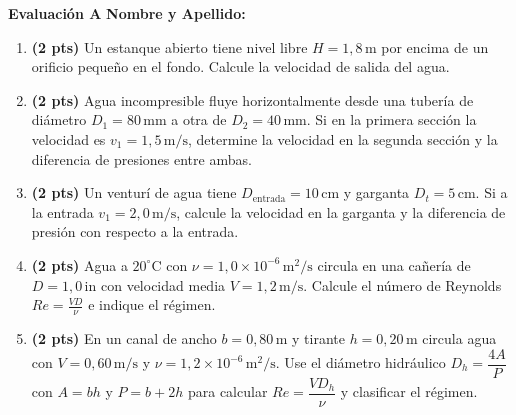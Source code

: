 \documentclass[a4paper,11pt]{article}
\begin{document}
\pagestyle{empty}

\noindent
\begin{minipage}[t]{0.48\textwidth}
    \textbf{Evaluación A} \hfill \textbf{Nombre y Apellido: \underline{\hspace{4cm}}}

    \vspace{0.2cm}
    \begin{enumerate}
        \item \textbf{(2 pts)} Un estanque abierto tiene nivel libre $H=1{,}8\,\mathrm{m}$ por encima de un orificio pequeño en el fondo. Calcule la velocidad de salida del agua.
        \item \textbf{(2 pts)} Agua incompresible fluye horizontalmente desde una tubería de diámetro $D_1=80\,\mathrm{mm}$ a otra de $D_2=40\,\mathrm{mm}$. Si en la primera sección la velocidad es $v_1=1{,}5\,\mathrm{m/s}$, determine la velocidad en la segunda sección y la diferencia de presiones entre ambas.
        \item \textbf{(2 pts)} Un venturí de agua tiene $D_\text{entrada}=10\,\mathrm{cm}$ y garganta $D_t=5\,\mathrm{cm}$. Si a la entrada $v_1=2{,}0\,\mathrm{m/s}$, calcule la velocidad en la garganta y la diferencia de presión con respecto a la entrada.
        \item \textbf{(2 pts)} Agua a $20^\circ\mathrm{C}$ con $\nu=1{,}0\times10^{-6}\,\mathrm{m^2/s}$ circula en una cañería de $D=1{,}0\,\mathrm{in}$ con velocidad media $V=1{,}2\,\mathrm{m/s}$. Calcule el número de Reynolds \(\displaystyle Re=\frac{VD}{\nu}\) e indique el régimen.
        \item \textbf{(2 pts)} En un canal de ancho $b=0{,}80\,\mathrm{m}$ y tirante $h=0{,}20\,\mathrm{m}$ circula agua con $V=0{,}60\,\mathrm{m/s}$ y $\nu=1{,}2\times10^{-6}\,\mathrm{m^2/s}$. Use el diámetro hidráulico \(D_h=\dfrac{4A}{P}\) con \(A=bh\) y \(P=b+2h\) para calcular \(Re=\dfrac{V D_h}{\nu}\) y clasificar el régimen.
    \end{enumerate}
\end{minipage}\hfill
\end{document}
